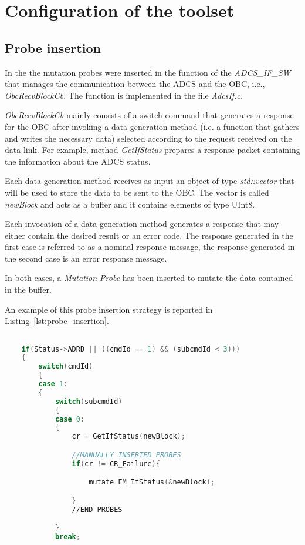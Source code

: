 
\chapter{Configuration of the toolset}

\section{Probe insertion}

In the \case the mutation probes were inserted in the function of the \emph{ADCS\_IF\_SW} that manages the communication between the ADCS and the OBC, i.e., \emph{ObcRecvBlockCb}. The function is implemented in the file \emph{AdcsIf.c.}

\emph{ObcRecvBlockCb} mainly consists of a switch command that generates a response for the OBC after invoking a data generation method (i.e. a function that gathers and writes the necessary data) selected according to the request received on the data link. For example, method \emph{GetIfStatus} prepares a response packet containing the information about the ADCS status.

Each data generation method receives as input an object of type \emph{std::vector} that will be used to store the data to be sent to the OBC. The vector is called \emph{newBlock} and acts as a buffer and it contains elements of type UInt8.

Each invocation of a data generation method generates a response that may either contain the desired result or an error code. The response generated in the first case is referred to as a nominal response message, the response generated in the second case is an error response message.

In both cases, a \emph{Mutation Probe} has been inserted to mutate the data contained in the buffer.

An example of this probe insertion strategy is reported in Listing~\ref{lst:probe_insertion}.

\begin{lstlisting}[language=C++, caption=Probe insertion Strategy, label={lst:probe_insertion}]

    if(Status->ADRD || ((cmdId == 1) && (subcmdId < 3)))
    {
        switch(cmdId)
        {
        case 1:
        {
            switch(subcmdId)
            {
            case 0:
            {
                cr = GetIfStatus(newBlock);

                //MANUALLY INSERTED PROBES
                if(cr != CR_Failure){

      		        mutate_FM_IfStatus(&newBlock);

                }
                //END PROBES

            }
            break;

\end{lstlisting}

